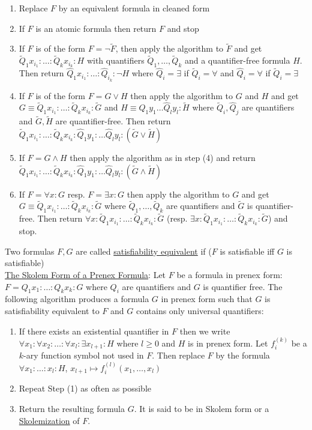 \documentclass[a4paper]{article}
\newcommand{\ul}{\underline}
\begin{document}
\begin{enumerate}[(1)]
	\item Replace $F$ by an equivalent formula in cleaned form
	\item If $F$ is an atomic formula then return $F$ and stop
	\item If $F$ is of the form $F=\neg \tilde F$, then apply the algorithm to $\tilde F$ and get $\tilde Q_1x_{i_1}:\dots:\tilde Q_kx_{i_k}:H$ with quantifiers $\tilde Q_1,\dots,\tilde Q_k$ and a quantifier-free formula $H$. Then return $\hat Q_1x_{i_1}:\dots:\hat Q_{i_k}:\neg H$ where $\hat Q_i=\exists$ if $\tilde Q_i=\forall$ and $\hat Q_i=\forall$ if $\tilde Q_i=\exists$
	\item If $F$ is of the form $F=G\vee H$ then apply the algorithm to $G$ and $H$ and get $G\equiv \tilde Q_1x_{i_1}:\dots:\tilde Q_kx_{i_k}:\tilde G$ and $H\equiv \hat Q_1y_1\dots \hat Q_ly_l:\tilde H$ where $\tilde Q_i,\hat Q_j$ are quantifiers and $\tilde G, \tilde H$ are quantifier-free. Then return $\tilde Q_1x_{i_1}:\dots:\tilde Q_kx_{i_k}:\hat Q_1y_1:\dots\hat Q_ly_l:(\tilde G\vee \tilde H)$
	\item If $F=G\wedge H$ then apply the algorithm as in step (4) and return $\tilde Q_1x_{i_1}:\dots:\tilde Q_kx_{i_k}:\hat Q_1y_1:\dots\hat Q_ly_l:(\tilde G\wedge \tilde H)$
	\item If $F=\forall x:G$ resp. $F=\exists x:G$ then apply the algorithm to $G$ and get $G\equiv\tilde Q_1x_{i_1}:\dots:\tilde Q_kx_{i_k}:\tilde G$ where $\tilde Q_1,\dots,\tilde Q_k$ are quantifiers and $\tilde G$ is quantifier-free. Then return $\forall x:\tilde Q_1x_{i_1}:\dots:\tilde Q_kx_{i_k}:\tilde G$ (resp. $\exists x:\tilde Q_1x_{i_1}:\dots:\tilde Q_kx_{i_k}:\tilde G$) and stop.
\end{enumerate}
Two formulas $F,G$ are called \ul{satisfiability equivalent} if ($F$ is satisfiable iff $G$ is satisfiable)\\
\ul{The Skolem Form of a Prenex Formula}: Let $F$ be a formula in prenex form: $F=Q_1x_1:\dots:Q_kx_k:G$ where $Q_i$ are quantifiers and $G$ is quantifier free. The following algorithm produces a formula $G$ in prenex form such that $G$ is satisfiability equivalent to $F$ and $G$ contains only universal quantifiers:
\begin{enumerate}[(1)]
	\item If there exists an existential quantifier in $F$ then we write $\forall x_1:\forall x_2:\dots:\forall x_l:\exists x_{l+1}:H$ where $l\geq 0$ and $H$ is in prenex form. Let $f_i^{(k)}$ be a $k$-ary function symbol not used in $F$. Then replace $F$ by the formula $\forall x_1:\dots:x_l:H$, $x_{l+1}\mapsto f_i^{(l)}(x_1,\dots,x_l)$
	\item Repeat Step (1) as often as possible
	\item Return the resulting formula $G$. It is said to be in Skolem form or a \ul{Skolemization} of $F$.
\end{enumerate}
\end{document}
